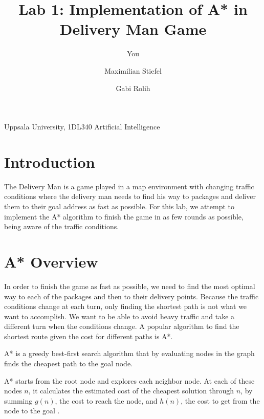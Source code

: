 \documentclass[a4paper]{article}
\title{Lab 1: Implementation of A* in Delivery Man Game}
\author{You}
\author{
	Maximilian Stiefel
    \and
    Gabi Rolih
}
\begin{document}
\begin{flushright}
  Uppsala University,
  1DL340 Artificial Intelligence
\end{flushright}

\begingroup
\let\newpage\relax%
\maketitle
\endgroup


\section{Introduction}
The Delivery Man is a game played in a map environment with changing traffic conditions where the delivery man needs to find his way to packages and deliver them to their goal address as fast as possible. For this lab, we attempt to implement the A* algorithm to finish the game in as few rounds as possible, being aware of the traffic conditions.

\section{A* Overview}
In order to finish the game as fast as possible, we need to find the most optimal way to each of the packages and then to their delivery points. Because the traffic conditions change at each turn, only finding the shortest path is not what we want to accomplish. We want to be able to avoid heavy traffic and take a different turn when the conditions change. A popular algorithm to find the shortest route given the cost for different paths is A*.

A* is a greedy best-first search algorithm that by evaluating nodes in the graph finds the cheapest path to the goal node.

A* starts from the root node and explores each neighbor node. At each of these nodes $n$, it calculates the estimated cost of the cheapest solution through $n$, by summing $g(n)$, the cost to reach the node, and $h(n)$, the cost to get from the node to the goal \citep{russell2009artificial}.
\end{document}

